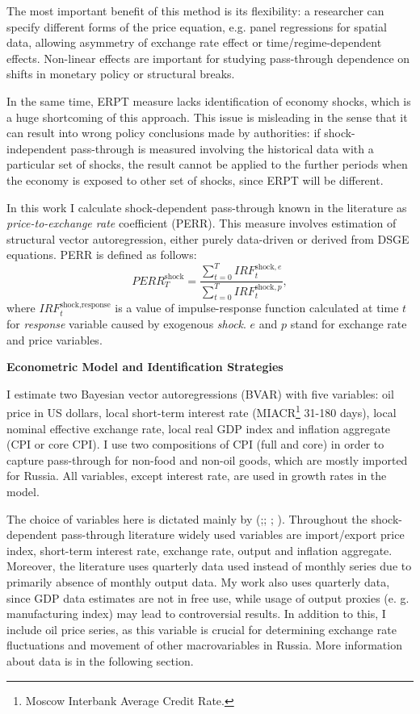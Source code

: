\documentclass[12pt, a4paper]{extarticle}
\begin{document}
The most important benefit of this method is its flexibility: a researcher can specify different forms of the price equation, e.g. panel regressions for spatial data, allowing asymmetry of exchange rate effect or time/regime-dependent effects. Non-linear effects are important for studying pass-through dependence on shifts in monetary policy or structural breaks. 

In the same time, ERPT measure lacks identification of economy shocks, which is a huge shortcoming of this approach. This issue is misleading in the sense that it can result into wrong policy conclusions made by authorities: if shock-independent pass-through is measured involving the historical data with a particular set of shocks, the result cannot be applied to the further periods when the economy is exposed to other set of shocks, since ERPT will be different.

In this work I calculate shock-dependent pass-through known in the literature as \textit{price-to-exchange rate} coefficient (PERR). This measure involves estimation of structural vector autoregression, either purely data-driven or derived from DSGE equations. PERR is defined as follows:
\begin{equation}
	PERR^{\text{shock}}_{T} = \frac{\sum_{t=0}^{T}IRF^{\text{shock}, e}_{t}}{\sum_{t=0}^{T}IRF_{t}^{\text{shock}, p}},
\end{equation}
where $IRF^{\text{shock}, \text{response}}_{t}$ is a value of impulse-response function calculated at time $t$ for \textit{response} variable caused by exogenous \textit{shock}. $e$ and $p$ stand for exchange rate and price variables.

\begin{center}
	\textbf{Econometric Model and Identification Strategies}
\end{center}

I estimate two Bayesian vector autoregressions (BVAR) with five variables: oil price in US dollars, local short-term interest rate (MIACR\footnote{Moscow Interbank Average Credit Rate.} 31-180 days), local nominal effective exchange rate, local real GDP index and inflation aggregate (CPI or core CPI). I use two compositions of CPI (full and core) in order to capture pass-through for non-food and non-oil goods, which are mostly imported for Russia. All variables, except interest rate, are used in growth rates in the model.

The choice of variables here is dictated mainly by (\cite{Hahn2003};\cite{Comunale2017}; \cite{Forbes2018}; \cite{LeivaLeon2019}). Throughout the shock-dependent pass-through literature widely used variables are import/export price index, short-term interest rate, exchange rate, output and inflation aggregate. Moreover, the literature uses quarterly data used instead of monthly series due to primarily absence of monthly output data. My work also uses quarterly data, since GDP data estimates are not in free use, while usage of output proxies (e. g. manufacturing index) may lead to controversial results. In addition to this, I include oil price series, as this variable is crucial for determining exchange rate fluctuations and movement of other macrovariables in Russia. More information about data is in the following section.
\end{document}
